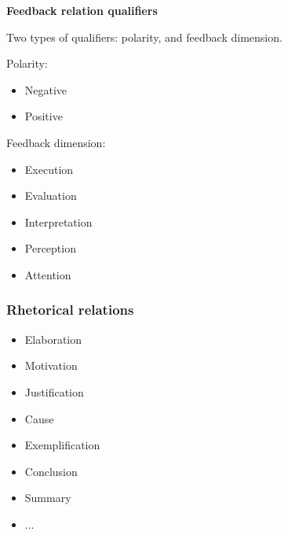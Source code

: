 \textbf{Feedback relation qualifiers}

Two types of qualifiers: polarity, and feedback dimension.

Polarity:

\begin{itemize}
	\item Negative
	\item Positive
\end{itemize}

Feedback dimension:

\begin{itemize}
	\item Execution
	\item Evaluation
	\item Interpretation
	\item Perception
	\item Attention
\end{itemize}

\subsubsection{Rhetorical relations}
\label{subsubsec:rhetorical_relations}

\begin{itemize}
	\item Elaboration
	\item Motivation
	\item Justification
	\item Cause
	\item Exemplification
	\item Conclusion
	\item Summary
	\item ...
\end{itemize}